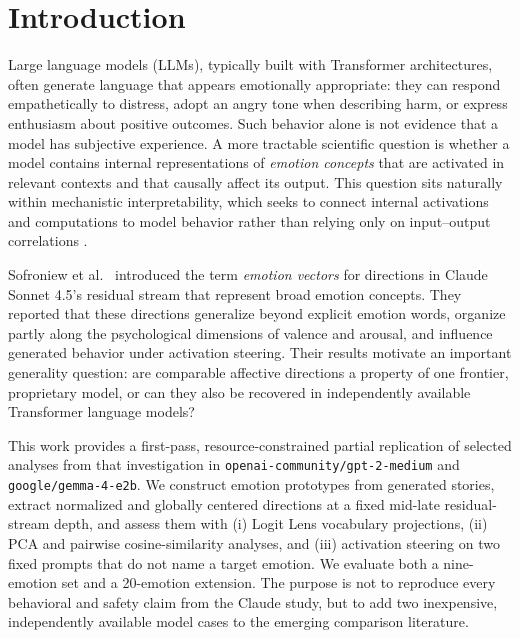 \section{Introduction}

Large language models (LLMs), typically built with Transformer architectures,
often generate language that appears emotionally appropriate: they can respond empathetically to distress, adopt an angry tone
when describing harm, or express enthusiasm about positive outcomes.  Such
behavior alone is not evidence that a model has subjective experience.  A more
tractable scientific question is whether a model contains internal
representations of \emph{emotion concepts} that are activated in relevant
contexts and that causally affect its output.  This question sits naturally
within mechanistic interpretability, which seeks to connect internal
activations and computations to model behavior rather than relying only on
input--output correlations \cite{vaswani_attention_2017,geva_transformer_2021,zou_representation_2023,sawant_mechanistic_2026}.

Sofroniew et al.\ \cite{sofroniew_emotion_2026} introduced the term
\emph{emotion vectors} for directions in Claude Sonnet 4.5's residual stream
that represent broad emotion concepts.  They reported that these directions
generalize beyond explicit emotion words, organize partly along the
psychological dimensions of valence and arousal, and influence generated
behavior under activation steering.  Their results motivate an important
generality question: are comparable affective directions a property of one
frontier, proprietary model, or can they also be recovered in independently
available Transformer language models?

This work provides a first-pass, resource-constrained partial replication of
selected analyses from that investigation in
\texttt{openai-community/gpt-2-medium} and
\texttt{google/gemma-4-e2b}.  We construct emotion prototypes from generated
stories, extract normalized and globally centered directions at a fixed
mid-late residual-stream depth, and assess them with (i) Logit Lens vocabulary
projections, (ii) PCA and pairwise cosine-similarity analyses, and (iii)
activation steering on two fixed prompts that do not name a target emotion.
We evaluate both a nine-emotion set and a 20-emotion extension.  The purpose is not to reproduce every
behavioral and safety claim from the Claude study, but to add two inexpensive,
independently available model cases to the emerging comparison literature.

